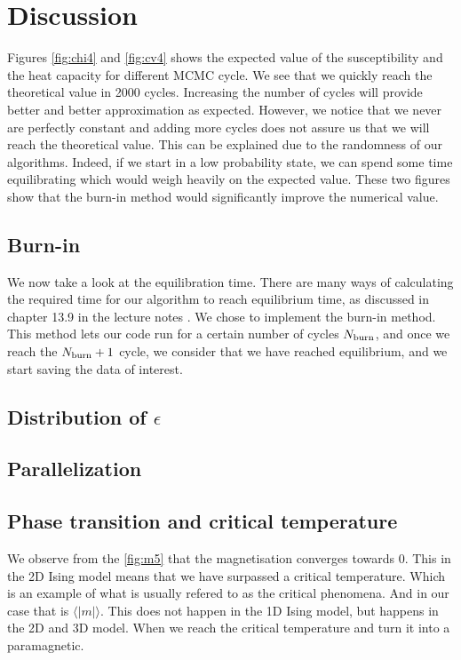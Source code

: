 \documentclass[english,notitlepage,reprint,nofootinbib]{revtex4-2}  %
\begin{document}
	\section{Discussion}\label{sec:discussion}
	Figures \ref{fig:chi4} and \ref{fig:cv4} shows the expected value of the susceptibility
	and the heat capacity for different MCMC cycle. We see that we quickly reach the theoretical
	value in 2000 cycles. Increasing the number of cycles will provide better and better
	approximation as expected. However, we notice that we never are perfectly constant and adding
	more cycles does not assure us that we will reach the theoretical value. This
	can be explained due to the randomness of our algorithms. Indeed, if we start in a low probability state, we can spend some time equilibrating which would weigh heavily on the
	expected value. These two figures show that the burn-in method would significantly improve
	the numerical value.


	\subsection{Burn-in}\label{subsec:dis burnin}

	We now take a look at the equilibration time. There are many ways of calculating the required
	time for our algorithm to reach equilibrium time, as discussed in chapter 13.9 in the lecture notes \cite{Morten15}. We chose
	to implement the burn-in method. This method lets our code run for a certain number
	of cycles $N_{\rm burn}$, and once we reach the $N_{\rm burn} + 1$ cycle, we consider that we have reached equilibrium, and we start saving the data of interest.


	\subsection{Distribution of $\epsilon$}\label{subsec:dis epsilon}

	\subsection{Parallelization}\label{subsec: dis parallelization}

	\subsection{Phase transition and critical temperature}\label{subsec: dis phase transition}
	We observe from the \autoref{fig:m5} that the magnetisation converges towards 0.
	This in the 2D Ising model means that we have surpassed a critical temperature.
	Which is an example of what is usually refered to as the critical phenomena.
	And in our case that is $\langle |m| \rangle$.
	This does not happen in the 1D Ising model, but happens in the 2D and 3D model.
	When we reach the critical temperature and turn it into a paramagnetic.
\end{document}
